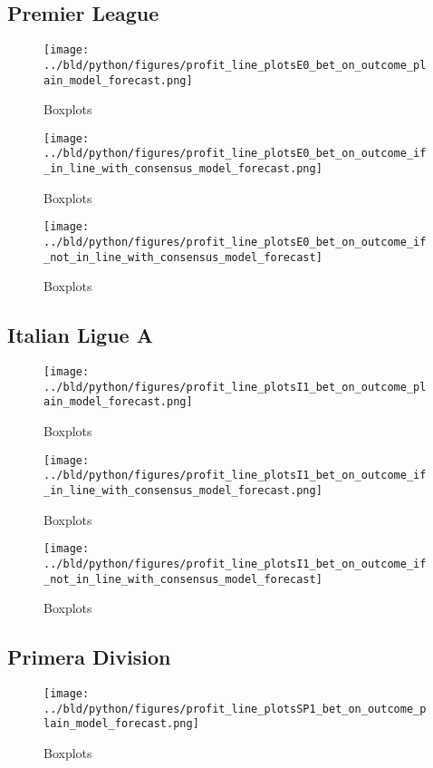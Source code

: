 \documentclass[11pt, a4paper, leqno]{article}
\begin{document}
\subsection{Premier League}
\begin{figure}[H]
    \centering
    \texttt{[image: ../bld/python/figures/profit\_line\_plotsE0\_bet\_on\_outcome\_plain\_model\_forecast.png]}
    \caption{Boxplots}
    \label{fig:figure2}
\end{figure}

\begin{figure}[H]
    \centering
    \texttt{[image: ../bld/python/figures/profit\_line\_plotsE0\_bet\_on\_outcome\_if\_in\_line\_with\_consensus\_model\_forecast.png]}
    \caption{Boxplots}
    \label{fig:figure2}
\end{figure}
\begin{figure}[H]
    \centering
    \texttt{[image: ../bld/python/figures/profit\_line\_plotsE0\_bet\_on\_outcome\_if\_not\_in\_line\_with\_consensus\_model\_forecast]}
    \caption{Boxplots}
    \label{fig:figure2}
\end{figure}





\subsection{Italian Ligue A}
\begin{figure}[H]
    \centering
    \texttt{[image: ../bld/python/figures/profit\_line\_plotsI1\_bet\_on\_outcome\_plain\_model\_forecast.png]}
    \caption{Boxplots}
    \label{fig:figure2}
\end{figure}

\begin{figure}[H]
    \centering
    \texttt{[image: ../bld/python/figures/profit\_line\_plotsI1\_bet\_on\_outcome\_if\_in\_line\_with\_consensus\_model\_forecast.png]}
    \caption{Boxplots}
    \label{fig:figure2}
\end{figure}
\begin{figure}[H]
    \centering
    \texttt{[image: ../bld/python/figures/profit\_line\_plotsI1\_bet\_on\_outcome\_if\_not\_in\_line\_with\_consensus\_model\_forecast]}
    \caption{Boxplots}
    \label{fig:figure2}
\end{figure}



\subsection{Primera Division}
\begin{figure}[H]
    \centering
    \texttt{[image: ../bld/python/figures/profit\_line\_plotsSP1\_bet\_on\_outcome\_plain\_model\_forecast.png]}
    \caption{Boxplots}
    \label{fig:figure2}
\end{figure}
\end{document}

